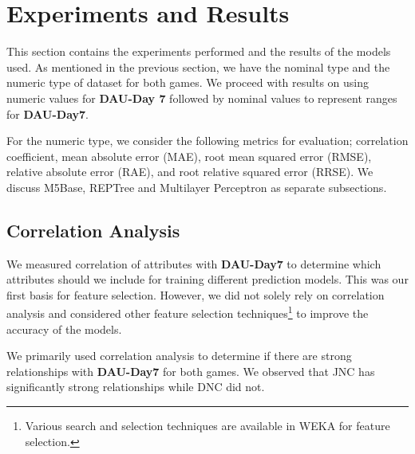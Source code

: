 \section{Experiments and Results}
This section contains the experiments performed and the results of the models used. As mentioned in the previous section, we have the nominal type and the numeric type of dataset for both games. We proceed with results on using numeric values for \textbf{DAU-Day 7} followed by nominal values to represent ranges for \textbf{DAU-Day7}.

For the numeric type, we consider the following metrics for evaluation; correlation coefficient, mean absolute error (MAE), root mean squared error (RMSE), relative absolute error (RAE), and root relative squared error (RRSE). We discuss M5Base, REPTree and Multilayer Perceptron as separate subsections.

\subsection{Correlation Analysis}
We measured correlation of attributes with \textbf{DAU-Day7} to determine which attributes should we include for training different prediction models. This was our first basis for feature selection. However, we did not solely rely on correlation analysis and considered other feature selection techniques\footnote{Various search and selection techniques are available in WEKA for feature selection.} to improve the accuracy of the models.

We primarily used correlation analysis to determine if there are strong relationships with \textbf{DAU-Day7} for both games. We observed that JNC has significantly strong relationships while DNC did not.

